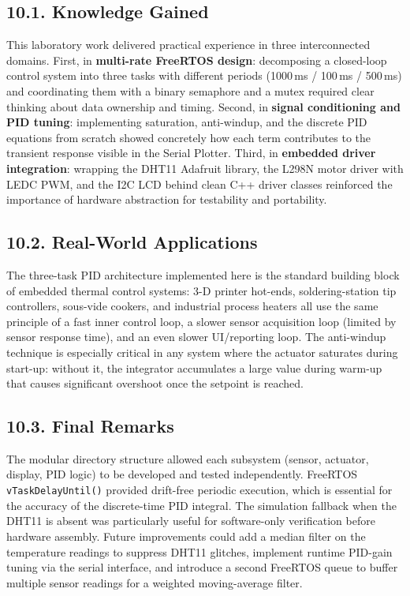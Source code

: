 \documentclass[12pt]{article}
\begin{document}
\subsection*{10.1. Knowledge Gained}

This laboratory work delivered practical experience in three interconnected domains. First, in
\textbf{multi-rate FreeRTOS design}: decomposing a closed-loop control system into three tasks with
different periods (1000\,ms / 100\,ms / 500\,ms) and coordinating them with a binary semaphore and
a mutex required clear thinking about data ownership and timing. Second, in \textbf{signal
conditioning and PID tuning}: implementing saturation, anti-windup, and the discrete PID equations
from scratch showed concretely how each term contributes to the transient response visible in the
Serial Plotter. Third, in \textbf{embedded driver integration}: wrapping the DHT11 Adafruit library,
the L298N motor driver with LEDC PWM, and the I2C LCD behind clean C++ driver classes reinforced the
importance of hardware abstraction for testability and portability.

\subsection*{10.2. Real-World Applications}

The three-task PID architecture implemented here is the standard building block of embedded thermal
control systems: 3-D printer hot-ends, soldering-station tip controllers, sous-vide cookers, and
industrial process heaters all use the same principle of a fast inner control loop, a slower sensor
acquisition loop (limited by sensor response time), and an even slower UI/reporting loop. The
anti-windup technique is especially critical in any system where the actuator saturates during
start-up: without it, the integrator accumulates a large value during warm-up that causes significant
overshoot once the setpoint is reached.

\subsection*{10.3. Final Remarks}

The modular directory structure allowed each subsystem (sensor, actuator, display, PID logic) to be
developed and tested independently. FreeRTOS \texttt{vTaskDelayUntil()} provided drift-free periodic
execution, which is essential for the accuracy of the discrete-time PID integral. The simulation
fallback when the DHT11 is absent was particularly useful for software-only verification before
hardware assembly. Future improvements could add a median filter on the temperature readings to
suppress DHT11 glitches, implement runtime PID-gain tuning via the serial interface, and introduce a
second FreeRTOS queue to buffer multiple sensor readings for a weighted moving-average filter.
\end{document}
